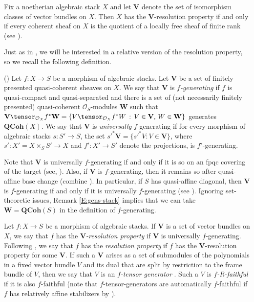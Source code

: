 \documentclass[reqno,a4paper]{amsart}
\numberwithin{Theorem}{section}
\newcommand{\Orb}{\mathcal{O}}
\newcommand{\Vect}{\mathbf{V}}
\newcommand{\QCoh}{\mathbf{QCoh}}
\theoremstyle{plain}
\theoremstyle{remark}
\begin{document}
\begin{remark} \label{rem:noetherianRP} Fix a noetherian algebraic stack $X$ and let $\Vect$ denote the set of isomorphism classes of vector bundles on $X$. Then $X$ has the $\Vect$-resolution property if and only if every coherent sheaf on $X$ is the quotient of a locally free sheaf of finite rank (see \cite[Rem. 5.2]{2013arXiv1306.5418G}). \end{remark}

Just as in \cite{2013arXiv1306.5418G}, we will be interested in a relative version of the resolution property, so we recall the following definition.
\begin{Definition}(\cite[Def.\ 2.7]{2013arXiv1306.5418G})
	Let $f \colon X \to S$ be a morphism of algebraic stacks. Let $\mathbf{V}$ be a set of finitely presented quasi-coherent sheaves on $X$. We say that $\mathbf{V}$ is \emph{$f$-generating} if $f$ is quasi-compact and quasi-separated and there is a set of (not necessarily finitely presented) quasi-coherent $\Orb_S$-modules $\mathbf{W}$ such that $\Vect \tensor_{\Orb_X} f^*\mathbf{W}=\{V \tensor_{\Orb_X} f^*W \,:\, V \in \Vect,\, W \in \mathbf{W}\}$ generates $\QCoh(X)$. We say that $\mathbf{V}$ is \emph{universally} $f$-generating if for every morphism of algebraic stacks $s \colon S' \to S$, the set $s'^*\Vect=\{s'^*V\colon V \in \mathbf{V}\}$, where $s' \colon X'=X\times_S S' \to X$ and $f' \colon X' \to S'$ denote the projections, is $f'$-generating. 
\end{Definition}
\begin{remark}\label{rem:universal-qaff}
 Note that $\Vect$ is universally $f$-generating if and only if it is so on an fpqc covering of the target (see, \cite[Prop.\ 2.8 (iii)]{2013arXiv1306.5418G}). Also, if $\Vect$ is $f$-generating, then it remains so after quasi-affine base change (combine \cite[Prop.\ 2.8 (ii),(v),(vi)]{2013arXiv1306.5418G}). In particular, if $S$ has quasi-affine diagonal, then $\mathbf{V}$ is $f$-generating if and only if it is universally $f$-generating (see \cite[Cor.\ 2.10]{2013arXiv1306.5418G}). Ignoring set-theoretic issues,  Remark \ref{E:gens-stack} implies that we can take $\mathbf{W} = \QCoh(S)$ in the definition of $f$-generating.
\end{remark}
 \begin{Definition}
 Let $f \colon X \to S$ be a morphism of algebraic stacks. If $\Vect$ is a set of vector bundles on $X$, we say that $f$ has the \emph{$\Vect$-resolution property} if $\Vect$ is universally $f$-generating. Following \cite[Def.\ 5.1]{2013arXiv1306.5418G}, we say that $f$ has the \emph{resolution property} if $f$ has the $\Vect$-resolution property for some $\Vect$. If such a $\mathbf{V}$ arises as a set of submodules of the
	polynomials in a fixed vector bundle $V$ and its dual that are split
	by restriction to the frame bundle of $V$, then we say that $V$ is an
	\emph{$f$-tensor generator} \cite[Defn.~6.1]{2013arXiv1306.5418G}. Such a $V$ is \emph{$f$-R-faithful} if it is also $f$-faithful (note that $f$-tensor-generators are automatically $f$-faithful if $f$ has relatively affine stabilizers by \cite[Thm.\ 6.4]{2013arXiv1306.5418G}). 
\end{Definition}
\end{document}

